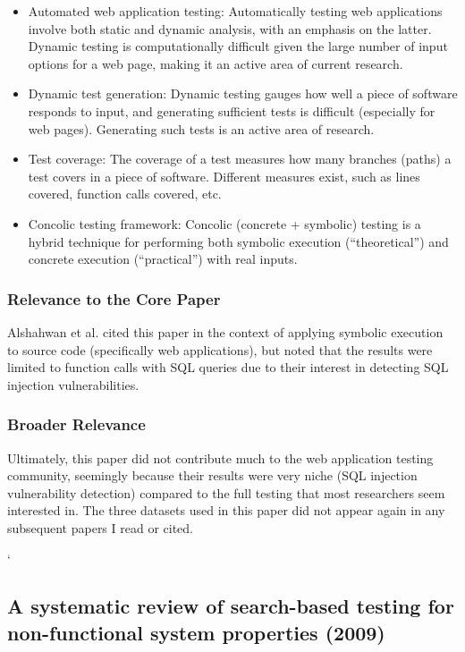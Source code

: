 \documentclass{sig-alternate-05-2015}
\begin{document}
\begin{itemize}
\item Automated web application testing: Automatically testing web applications involve both static and dynamic analysis, with an emphasis on the latter. Dynamic testing is computationally difficult given the large number of input options for a web page, making it an active area of current research.
\item Dynamic test generation: Dynamic testing gauges how well a piece of software responds to input, and generating sufficient tests is difficult (especially for web pages). Generating such tests is an active area of research.
\item Test coverage: The coverage of a test measures how many branches (paths) a test covers in a piece of software. Different measures exist, such as lines covered, function calls covered, etc.
\item Concolic testing framework: Concolic (concrete + symbolic) testing is a hybrid technique for performing both symbolic execution (``theoretical'') and concrete execution (``practical'') with real inputs.
\end{itemize}

\subsubsection{Relevance to the Core Paper}
Alshahwan et al. \cite{alshahwan2011automated} cited this paper in the context of applying symbolic execution to source code (specifically web applications), but noted that the results were limited to function calls with SQL queries due to their interest in detecting SQL injection vulnerabilities. 

\subsubsection{Broader Relevance}
Ultimately, this paper did not contribute much to the web application testing community, seemingly because their results were very niche (SQL injection vulnerability detection) compared to the full testing that most researchers seem interested in. The three datasets used in this paper did not appear again in any subsequent papers I read or cited. 

`
\subsection{A systematic review of search-based testing for non-functional system properties (2009)}
\end{document}
